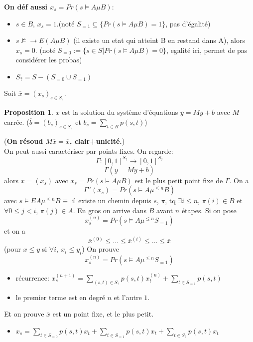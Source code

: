 \documentclass[12pt]{article}
\theoremstyle{plain}
\theoremstyle{definition}
\newtheorem{prop}[subsubsection]{Proposition}
\theoremstyle{remark}
\begin{document}
\noindent \textbf{On déf aussi $x_s=Pr(s\vDash A\mu B)$}:
\begin{itemize}
    \item $s\in B$, $x_s=1$.(noté $S_{=1}\subseteq \{Pr(s\vDash A\mu B)=1\}$, pas d'égalité)
    \item $s\nvDash \to E(A\mu B)$ (il existe un etat qui atteint B en restand dans A),
     alors $x_s=0$. (noté $S_{=0}:=\{s\in S| Pr(s\vDash A\mu B)=0\}$, egalité ici, permet de pas considérer
     les probas)
    \item $S_?=S-(S_{=0}\cup S_{=1})$
\end{itemize}
Soit $\overline{x}=(x_s)_{s\in S_?}$.
\begin{prop}
    $\overline{x}$ est la solution du système d'équations $\overline{y}=M\overline{y}+\overline{b}$
    avec $M$ carrée. ($\overline{b}=(b_s)_{s\in S_?}$ et $b_s=\sum_{t\in B} p(s,t)$)
\end{prop}
(\textbf{On résoud $M\overline{x}=\overline{x}$, clair+unicité.}) \\

On peut aussi caractériser par points fixes. On regarde: 
\[
    \Gamma: [0,1]^{S_?}\to[0,1]^{S_?}
\]
\[
    \Gamma(\overline{y}=M\overline{y}+\overline{b})   
\]
alors $\overline{x}=(x_s)$ avec $x_s=Pr(s\vDash A\mu B)$ est 
le plus petit point fixe de $\Gamma$. On a 
\[
    \Gamma^{n}(x_s)=Pr(s\vDash A\mu^{\leq n}B)
\]
avec $s\vDash EA\mu^{\leq n}B\equiv$ il existe un chemin depuis $s$, $\pi$, tq 
$\exists i\leq n$, $\pi(i)\in B$ et $\forall0\leq j<i$, $\pi(j)\in A$. En gros 
on arrive dans $B$ avant $n$ étapes. Si on pose 
\[
    x_s^{(n)}=Pr(s\vDash A\mu^{\leq n}S_{=1})   
\]
et on a 
\[
    \overline{x}^{(0)}\leq\ldots\leq\overline{x}^{(i)}\leq\ldots\leq \overline{x}
\]
(pour $x\leq y$ si $\forall i,~x_i\leq y_i$)
On prouve 
\[
    x_s^{(n)}=Pr(s\vDash A\mu^{\leq n}S_{=1})   
\]
\begin{itemize}
    \item récurrence: $x_s^{(n+1)}=\sum_{(s,t)\in S_?} p(s,t)x_t^{(n)}+\sum_{t\in S_{=1}} p(s,t)$
    \item le premier terme est en degré $n$ et l'autre $1$.
\end{itemize}
Et on prouve $\overline{x}$ est un point fixe, et le plus petit. 
\begin{itemize}
    \item $x_s=\sum_{t\in S_{=0}} p(s,t)x_t+\sum_{t\in S_{=1}}p(s,t)x_t+\sum_{t\in S_?}p(s,t)x_t$
\end{itemize}
\end{document}
